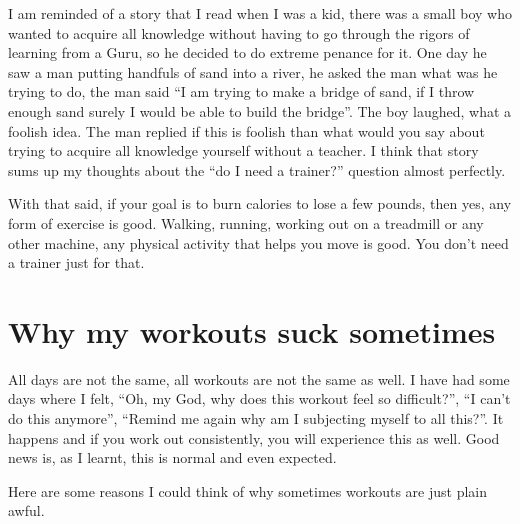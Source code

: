 \documentclass[
  oneside]{book}
\begin{document}
I am reminded of a story that I read when I was a kid, there was a small boy who wanted to acquire all knowledge without having to go through the rigors of learning from a Guru, so he decided to do extreme penance for it. One day he saw a man putting handfuls of sand into a river, he asked the man what was he trying to do, the man said ``I am trying to make a bridge of sand, if I throw enough sand surely I would be able to build the bridge''. The boy laughed, what a foolish idea. The man replied if this is foolish than what would you say about trying to acquire all knowledge yourself without a teacher. I think that story sums up my thoughts about the ``do I need a trainer?'' question almost perfectly.

With that said, if your goal is to burn calories to lose a few pounds, then yes, any form of exercise is good. Walking, running, working out on a treadmill or any other machine, any physical activity that helps you move is good. You don't need a trainer just for that.

\hypertarget{why-my-workouts-suck-sometimes}{%
\section{Why my workouts suck sometimes}\label{why-my-workouts-suck-sometimes}}

All days are not the same, all workouts are not the same as well. I have had some days where I felt, ``Oh, my God, why does this workout feel so difficult?'', ``I can't do this anymore'', ``Remind me again why am I subjecting myself to all this?''. It happens and if you work out consistently, you will experience this as well. Good news is, as I learnt, this is normal and even expected.

Here are some reasons I could think of why sometimes workouts are just plain awful.
\end{document}
